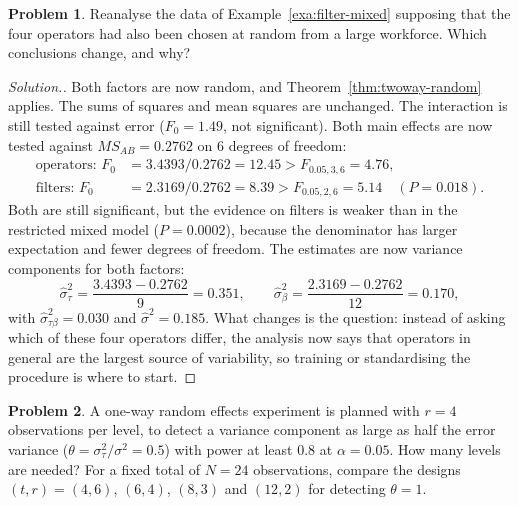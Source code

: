 \documentclass[11pt,a4paper]{article}
\numberwithin{equation}{section}
\theoremstyle{definition}
\newtheorem{problemx}{Problem}[subsection]
\newenvironment{problem}{\begin{problemx}}{\end{problemx}}
\newenvironment{solution}
  {\renewcommand{\qedsymbol}{}\begin{proof}[\textit{Solution}.]}
  {\end{proof}}
\begin{document}
\begin{problem}
Reanalyse the data of Example~\ref{exa:filter-mixed} supposing that the four operators had also been chosen at random from a large workforce. Which
conclusions change, and why?
\end{problem}

\begin{solution}
Both factors are now random, and Theorem~\ref{thm:twoway-random} applies. The sums of squares and mean squares are unchanged. The interaction is
still tested against error ($F_0 = 1.49$, not significant). Both main effects are now tested against $MS_{AB} = 0.2762$ on $6$ degrees of freedom:
\begin{align*}
\text{operators: } F_0 &= 3.4393/0.2762 = 12.45 > F_{0.05, 3, 6} = 4.76 , \\
\text{filters: } F_0 &= 2.3169/0.2762 = 8.39 > F_{0.05, 2, 6} = 5.14 \quad (P = 0.018) .
\end{align*}
Both are still significant, but the evidence on filters is weaker than in the restricted mixed model ($P = 0.0002$), because the denominator has
larger expectation and fewer degrees of freedom. The estimates are now variance components for both factors:
\[
\hat\sigma^2_\tau = \frac{3.4393 - 0.2762}9 = 0.351 , \qquad \hat\sigma^2_\beta = \frac{2.3169 - 0.2762}{12} = 0.170 ,
\]
with $\hat\sigma^2_{\tau\beta} = 0.030$ and $\hat\sigma^2 = 0.185$. What changes is the question: instead of asking which of these four operators differ, the analysis
now says that operators in general are the largest source of variability, so training or standardising the procedure is where to start.
\end{solution}

\begin{problem}
A one-way random effects experiment is planned with $r = 4$ observations per level, to detect a variance component as large as half the error
variance ($\theta = \sigma^2_\tau/\sigma^2 = 0.5$) with power at least $0.8$ at $\alpha = 0.05$. How many levels are needed? For a fixed total of $N = 24$ observations, compare
the designs $(t, r) = (4, 6)$, $(6, 4)$, $(8, 3)$ and $(12, 2)$ for detecting $\theta = 1$.
\end{problem}
\end{document}

